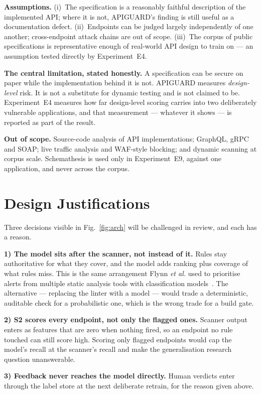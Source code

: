 \documentclass[conference]{IEEEtran}
\begin{document}
\textbf{Assumptions.} (i)~The specification is a reasonably faithful description of the
implemented API; where it is not, APIGUARD's finding is still useful as a documentation
defect. (ii)~Endpoints can be judged largely independently of one another; cross-endpoint
attack chains are out of scope. (iii)~The corpus of public specifications is representative
enough of real-world API design to train on --- an assumption tested directly by
Experiment~E4.

\textbf{The central limitation, stated honestly.} A specification can be secure on paper while
the implementation behind it is not. APIGUARD measures \emph{design-level} risk. It is not a
substitute for dynamic testing and is not claimed to be. Experiment~E4 measures how far
design-level scoring carries into two deliberately vulnerable applications, and that
measurement --- whatever it shows --- is reported as part of the result.

\textbf{Out of scope.} Source-code analysis of API implementations; GraphQL, gRPC and SOAP;
live traffic analysis and WAF-style blocking; and dynamic scanning at corpus scale. Schemathesis
is used only in Experiment~E9, against one application, and never across
the corpus.

\section{Design Justifications}
Three decisions visible in Fig.~\ref{fig:arch} will be challenged in review, and each has a
reason.

\textbf{1) The model sits after the scanner, not instead of it.} Rules stay authoritative for
what they cover, and the model adds ranking plus coverage of what rules miss. This is the same
arrangement Flynn \emph{et al.} used to prioritise alerts from multiple static analysis tools
with classification models~\cite{flynn}. The alternative --- replacing the linter with a model
--- would trade a deterministic, auditable check for a probabilistic one, which is the wrong
trade for a build gate.

\textbf{2) S2 scores every endpoint, not only the flagged ones.} Scanner output enters as
features that are zero when nothing fired, so an endpoint no rule touched can still score
high. Scoring only flagged endpoints would cap the model's recall at the scanner's recall and
make the generalisation research question unanswerable.

\textbf{3) Feedback never reaches the model directly.} Human verdicts enter through the label
store at the next deliberate retrain, for the reason given above.
\end{document}

